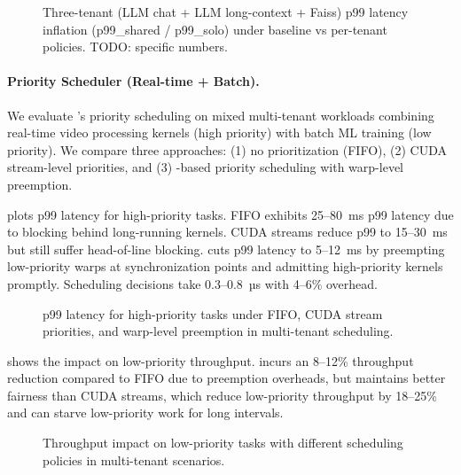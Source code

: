 \begin{figure}
\centering
{}
\caption{Three-tenant (LLM chat + LLM long-context + Faiss) p99 latency inflation (p99\_shared / p99\_solo) under baseline vs \sys per-tenant policies. TODO: specific numbers.}
\label{fig:three-tenant}
\end{figure}

\paragraph{Priority Scheduler (Real-time + Batch).}
We evaluate \sys's priority scheduling on mixed multi-tenant workloads combining real-time video processing kernels (high priority) with batch ML training (low priority). We compare three approaches: (1) no prioritization (FIFO), (2) CUDA stream-level priorities, and (3) \sys-based priority scheduling with warp-level preemption.

 plots p99 latency for high-priority tasks. FIFO exhibits 25--80~ms p99 latency due to blocking behind long-running kernels. CUDA streams reduce p99 to 15--30~ms but still suffer head-of-line blocking. \sys cuts p99 latency to 5--12~ms by preempting low-priority warps at synchronization points and admitting high-priority kernels promptly. Scheduling decisions take 0.3--0.8~µs with 4--6\% overhead.

\begin{figure}
\centering
{}
\caption{p99 latency for high-priority tasks under FIFO, CUDA stream priorities, and \sys warp-level preemption in multi-tenant scheduling.}
\label{fig:p99-latency}
\end{figure}

 shows the impact on low-priority throughput. \sys incurs an 8--12\% throughput reduction compared to FIFO due to preemption overheads, but maintains better fairness than CUDA streams, which reduce low-priority throughput by 18--25\% and can starve low-priority work for long intervals.

\begin{figure}
\centering
{}
\caption{Throughput impact on low-priority tasks with different scheduling policies in multi-tenant scenarios.}
\label{fig:lowprio-throughput}
\end{figure}

